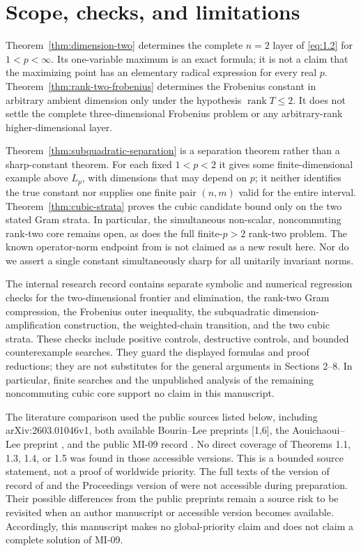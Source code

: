 \documentclass[11pt]{article}
\begin{document}
\section{Scope, checks, and limitations}


Theorem~\ref{thm:dimension-two} determines the complete $n=2$ layer of \eqref{eq:1.2} for
$1<p<\infty$. Its one-variable maximum is an exact formula; it is not a claim that
the maximizing point has an elementary radical expression for every real $p$.
Theorem~\ref{thm:rank-two-frobenius} determines the Frobenius constant in arbitrary ambient dimension only
under the hypothesis $\operatorname{rank}T\le2$. It does not settle the complete
three-dimensional Frobenius problem or any arbitrary-rank higher-dimensional layer.

Theorem~\ref{thm:subquadratic-separation} is a separation theorem rather than a sharp-constant theorem. For each
fixed $1<p<2$ it gives some finite-dimensional example above $L_p$, with dimensions
that may depend on $p$; it neither identifies the true constant nor supplies one
finite pair $(n,m)$ valid for the entire interval. Theorem~\ref{thm:cubic-strata} proves the cubic
candidate bound only on the two stated Gram strata. In particular, the simultaneous
non-scalar, noncommuting rank-two core remains open, as does the full finite-$p>2$
rank-two problem. The known operator-norm endpoint from \cite{zhang} is not claimed as a new
result here. Nor do we assert a single constant simultaneously sharp for all
unitarily invariant norms.

The internal research record contains separate symbolic and numerical regression
checks for the two-dimensional frontier and elimination, the rank-two Gram
compression, the Frobenius outer inequality, the subquadratic dimension-amplification
construction, the weighted-chain transition, and the two cubic strata. These checks
include positive controls, destructive controls, and bounded counterexample searches.
They guard the displayed formulas and proof reductions; they are not substitutes for
the general arguments in Sections 2--8. In particular, finite searches and the
unpublished analysis of the remaining noncommuting cubic core support no claim in
this manuscript.

The literature comparison used the public sources listed below, including
arXiv:2603.01046v1, both available Bourin--Lee preprints [1,6], the
Aouichaoui--Lee preprint \cite{aouichaoui-lee}, and the public MI-09 record \cite{mi09}. No direct coverage of
Theorems 1.1, 1.3, 1.4, or 1.5 was found in those accessible versions. This is a
bounded source statement, not a proof of worldwide priority. The full texts of the
version of record of \cite{zhang} and the Proceedings version of \cite{bourin-lee} were not accessible
during preparation. Their possible differences from the public preprints remain a
source risk to be revisited when an author manuscript or accessible version becomes
available. Accordingly, this manuscript makes no global-priority claim and does not
claim a complete solution of MI-09.
\end{document}
